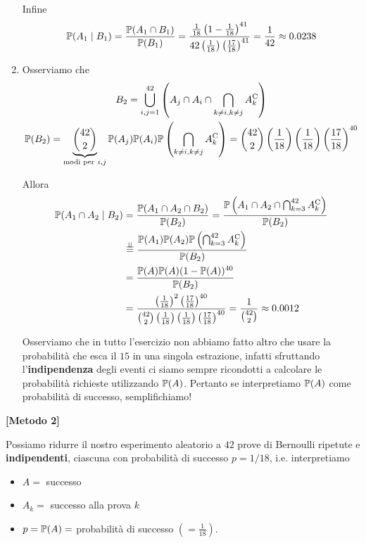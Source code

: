 \begin{enumerate}
Infine
\begin{equation*}
\mathbb{P}( A_{1} \mid B_{1}) =\frac{\mathbb{P}( A_{1} \cap B_{1})}{\mathbb{P}( B_{1})} =\frac{\frac{1}{18}\left( 1-\frac{1}{18}\right)^{41}}{42\left(\frac{1}{18}\right)\left(\frac{17}{18}\right)^{41}} =\frac{1}{42} \approx 0.0238
\end{equation*}
\item Osserviamo che
\begin{gather*}
B_{2} =\bigcup _{i,j=1}^{42}\left( A_{j} \cap A_{i} \cap \bigcap _{k\neq i,k\neq j} A_{k}^{\mathrm{C}}\right)\\
\mathbb{P}( B_{2}) =\underbrace{\binom{42}{2}}_{\text{modi per} \ i,j}\mathbb{P}( A_{j})\mathbb{P}( A_{i})\mathbb{P}\left(\bigcap _{k\neq i,k\neq j} A_{k}^{\mathrm{C}}\right) =\binom{42}{2}\left(\frac{1}{18}\right)\left(\frac{1}{18}\right)\left(\frac{17}{18}\right)^{40}
\end{gather*}

Allora
\begin{align*}
\mathbb{P}( A_{1} \cap A_{2} \mid B_{2}) & =\frac{\mathbb{P}( A_{1} \cap A_{2} \cap B_{2})}{\mathbb{P}( B_{2})} =\frac{\mathbb{P}\left( A_{1} \cap A_{2} \cap \bigcap _{k=3}^{42} A_{k}^{\mathrm{C}}\right)}{\mathbb{P}( B_{2})}\\
 & \overset{\perp \!\!\! \perp }{=}\frac{\mathbb{P}( A_{1})\mathbb{P}( A_{2})\mathbb{P}\left(\bigcap _{k=3}^{42} A_{k}^{\mathrm{C}}\right)}{\mathbb{P}( B_{2})}\\
 & =\frac{\mathbb{P}( A)\mathbb{P}( A)( 1-\mathbb{P}( A))^{40}}{\mathbb{P}( B_{2})}\\
 & =\frac{\left(\frac{1}{18}\right)^{2}\left(\frac{17}{18}\right)^{40}}{\binom{42}{2}\left(\frac{1}{18}\right)\left(\frac{1}{18}\right)\left(\frac{17}{18}\right)^{40}} =\frac{1}{\binom{42}{2}} \approx 0.0012
\end{align*}

\begin{oss}
Osserviamo che in tutto l'esercizio non abbiamo fatto altro che usare la probabilità che esca il $15$ in una singola estrazione, infatti sfruttando l'\textbf{indipendenza} degli eventi ci siamo sempre ricondotti a calcolare le probabilità richieste utilizzando $\mathbb{P}( A)$. Pertanto se interpretiamo $\mathbb{P}( A)$ come probabilità di successo, semplifichiamo!
\end{oss}
\end{enumerate}
\textbf{[Metodo 2]}

Possiamo ridurre il nostro esperimento aleatorio a $42$ prove di Bernoulli ripetute e \textbf{indipendenti}, ciascuna con probabilità di successo $p=1/18$, i.e. interpretiamo
\begin{itemize}
\item $A=$ successo
\item $A_{k} =$ successo alla prova $k$
\item $p=\mathbb{P}( A) =$ probabilità di successo $\left( =\frac{1}{18}\right)$.
\end{itemize}

